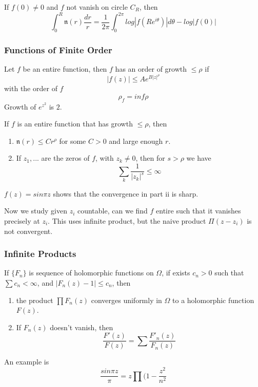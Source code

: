 \documentclass[main.tex]{subfiles}
\begin{document}
If $f(0) \neq 0$ and $f$ not vanish on circle $C_R$, then
$$
\int_0 ^R \mathfrak{n}(r) \frac{dr}{r} = \frac{1}{2\pi} \int_0 ^{2 \pi} log |f(Re^{i\theta})| d\theta - log|f(0)|
$$

\subsubsection{Functions of Finite Order}
Let $f$ be an entire function, then $f$ has an order of growth $\leq \rho$ if 
$$
|f(z)| \leq A e^{B |z|^{\rho}}
$$
with the order of $f$ 
$$
\rho_f = inf \rho
$$
Growth of $e^{z^2}$ is $2$.

\begin{theorem}
If $f$ is an entire function that has growth $\leq \rho$, then 
\begin{enumerate}
    \item $\mathfrak{n}(r) \leq C r^\rho$ for some $C > 0$ and large enough $r$.
    \item If $z_1, ...$ are the zeros of $f$, with $z_k \neq 0$, then for $s > \rho$ we have 
    $$
    \sum_k \frac{1}{|z_k|^s} \leq \infty
    $$
\end{enumerate}
\end{theorem}

$f(z) = sin \pi z$ shows that the convergence in part ii is sharp. 

Now we study given $z_i$ countable, can we find $f$ entire such that it vanishes precisely at $z_i$. This uses infinite product, but the naive product $\Pi(z - z_i)$ is not convergent.

\subsubsection{Infinite Products}

\begin{proposition}
If $\{F_n\}$ is sequence of holomorphic functions on $\Omega$, if exists $c_n > 0$ such that 
$\sum c_n < \infty$, and $|F_n(z) - 1| \leq c_n$, then 
\begin{enumerate}
    \item the product $\prod F_n(z)$ converges uniformly in $\Omega$ to a holomorphic function $F(z)$.
    \item If $F_n(z)$ doesn't vanish, then
    $$
    \frac{F'(z)}{F(z)} = \sum     \frac{F'_n(z)}{F_n(z)}
    $$
\end{enumerate}
\end{proposition}

An example is 
$$
\frac{sin \pi z}{\pi } = z \prod (1 - \frac{z^2}{n^2}
$$
\end{document}
